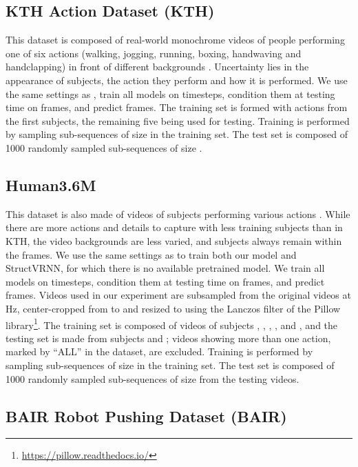 \documentclass{article}
\begin{document}
\subsection{KTH Action Dataset (KTH)}
\label{app:Dataset-KTH}

This dataset is composed of real-world  monochrome videos of  people performing one of six actions (walking, jogging, running, boxing, handwaving and handclapping) in front of different backgrounds \citep{Schuldt2004}.
Uncertainty lies in the appearance of subjects, the action they perform and how it is performed.
We use the same settings as \citet{Denton2018}, train all models on  timesteps, condition them at testing time on  frames, and predict  frames.
The training set is formed with actions from the first  subjects, the remaining five being used for testing.
Training is performed by sampling sub-sequences of size  in the training set.
The test set is composed of \num{1000} randomly sampled sub-sequences of size .

\subsection{Human3.6M}
\label{app:Dataset-Human}

This dataset is also made of videos of subjects performing various actions \citep{Ionescu2011, Ionescu2014}.
While there are more actions and details to capture with less training subjects than in KTH, the video backgrounds are less varied, and subjects always remain within the frames.
We use the same settings as \citet{Minderer2019} to train both our model and StructVRNN, for which there is no available pretrained model.
We train all models on  timesteps, condition them at testing time on  frames, and predict  frames.
Videos used in our experiment are subsampled from the original videos at Hz, center-cropped from  to  and resized to  using the Lanczos filter of the Pillow library\footnote{\url{https://pillow.readthedocs.io/}}.
The training set is composed of videos of subjects , , , , and , and the testing set is made from subjects  and ; videos showing more than one action, marked by ``ALL'' in the dataset, are excluded.
Training is performed by sampling sub-sequences of size  in the training set.
The test set is composed of \num{1000} randomly sampled sub-sequences of size  from the testing videos.

\subsection{BAIR Robot Pushing Dataset (BAIR)}
\label{app:Dataset-BAIR}
\end{document}
